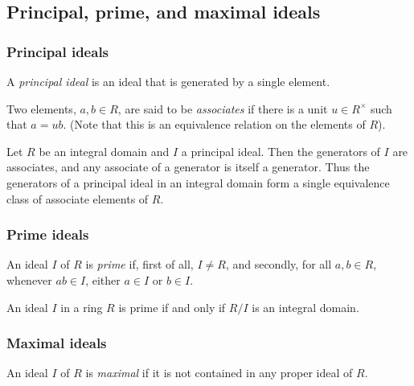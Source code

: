 \documentclass{maths}
\begin{document}
\subsection{Principal, prime, and maximal ideals}

\subsubsection{Principal ideals}

\begin{defn}
    A \emph{principal ideal} is an ideal that is generated by a single element.
\end{defn}

\begin{defn}[Associates]
    Two elements, $a,b\in R$, are said to be \emph{associates} if there is a unit $u\in R^{\times}$ such that $a=ub$.
    (Note that this is an equivalence relation on the elements of $R$).
\end{defn}

\begin{lem}
    Let $R$ be an integral domain and $I$ a principal ideal.
    Then the generators of $I$ are associates, and any associate of a generator is itself a generator.
    Thus the generators of a principal ideal in an integral domain form a single equivalence class of associate elements of $R$.
\end{lem}

\subsubsection{Prime ideals}

\begin{defn}
    An ideal $I$ of $R$ is \emph{prime} if, first of all, $I\neq R$, and secondly, for all $a,b\in R$, whenever $ab\in I$, either $a\in I$ or $b\in I$.
\end{defn}

\begin{lem}
    An ideal $I$ in a ring $R$ is prime if and only if $R/I$ is an integral domain.
\end{lem}

\subsubsection{Maximal ideals}

\begin{defn}
    An ideal $I$ of $R$ is \emph{maximal} if it is not contained in any proper ideal of $R$.
\end{defn}
\end{document}
